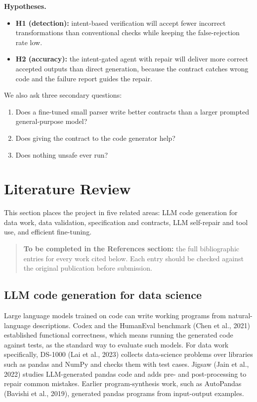 \documentclass[11pt]{article}
\providecommand{\tightlist}{\setlength{\itemsep}{0pt}\setlength{\parskip}{0pt}}
\begin{document}
\textbf{Hypotheses.}

\begin{itemize}
\tightlist
\item
  \textbf{H1 (detection):} intent-based verification will accept fewer
  incorrect transformations than conventional checks while keeping the
  false-rejection rate low.
\item
  \textbf{H2 (accuracy):} the intent-gated agent with repair will
  deliver more correct accepted outputs than direct generation, because
  the contract catches wrong code and the failure report guides the
  repair.
\end{itemize}

We also ask three secondary questions:

\begin{enumerate}
\def\labelenumi{\arabic{enumi}.}
\tightlist
\item
  Does a fine-tuned small parser write better contracts than a larger
  prompted general-purpose model?
\item
  Does giving the contract to the code generator help?
\item
  Does nothing unsafe ever run?
\end{enumerate}

\section{Literature Review}

This section places the project in five related areas: LLM code
generation for data work, data validation, specification and contracts,
LLM self-repair and tool use, and efficient fine-tuning.

\begin{quote}
\textbf{To be completed in the References section:} the full
bibliographic entries for every work cited below. Each entry should be
checked against the original publication before submission.
\end{quote}

\subsection{LLM code generation for data science}

Large language models trained on code can write working programs from
natural-language descriptions. Codex and the HumanEval benchmark (Chen
et al., 2021) established functional correctness, which means running
the generated code against tests, as the standard way to evaluate such
models. For data work specifically, DS-1000 (Lai et al., 2023) collects
data-science problems over libraries such as pandas and NumPy and checks
them with test cases. Jigsaw (Jain et al., 2022) studies LLM-generated
pandas code and adds pre- and post-processing to repair common mistakes.
Earlier program-synthesis work, such as AutoPandas (Bavishi et al.,
2019), generated pandas programs from input-output examples.
\end{document}
